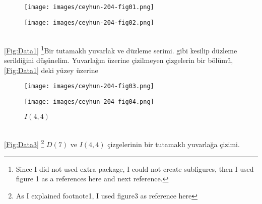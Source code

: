 \documentclass[11pt]{amsbook}
\begin{document}
	\begin{figure}[h!]
		\begin{minipage}{0.5\textwidth}
			\centering
			\texttt{[image: images/ceyhun-204-fig01.png]}
			\caption{}\label{Fig:Data1}
		\end{minipage}\hfill
		\begin {minipage}{0.5\textwidth}
		\centering
		\texttt{[image: images/ceyhun-204-fig02.png]}
		\caption{}\label{Fig:Data2}
	\end{minipage}
	\end{figure} \\
 \figurename \ref{Fig:Data1} \footnote[1]{Since I did not used extra package, I could not create subfigures, then I used figure 1 as a references here and next reference.}Bir tutamaklı yuvarlak ve düzleme serimi. gibi kesilip düzleme serildiğini düşünelim. Yuvarlağın üzerine çizilmeyen çizgelerin bir bölümü, \figurename \ref{Fig:Data1} deki yüzey üzerine
	\begin{figure}[h!]
		\begin{minipage}{0.5\textwidth}
			\centering
			\texttt{[image: images/ceyhun-204-fig03.png]}
			\caption{\hspace{1cm}$D(7)$}\label{Fig:Data3}
		\end{minipage}\hfill
		\begin {minipage}{0.5\textwidth}
		\centering
		\texttt{[image: images/ceyhun-204-fig04.png]}
		\caption{\hspace{1cm}$I(4,4)$}  \label{Fig:Data4}
	\end{minipage}
	\end{figure} \\
	\figurename \ref{Fig:Data3} \footnote[2]{As I explained footnote1, I used figure3 as reference here} $D(7)$ ve $I(4,4)$ çizgelerinin bir tutamaklı yuvarlağa çizimi.
	
\end{document}

